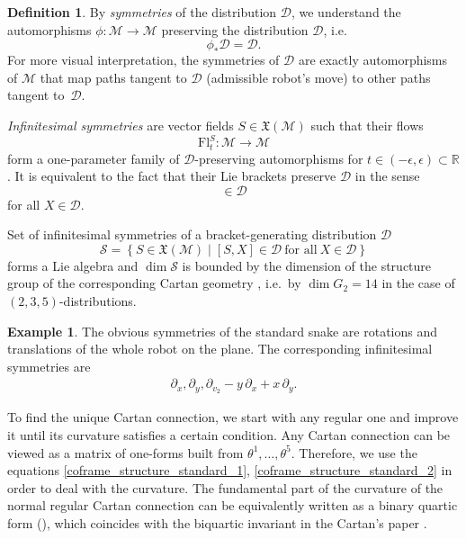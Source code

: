\documentclass{amsart}
\theoremstyle{plain}
\theoremstyle{definition}
\newtheorem*{definition}{Definition}
\newtheorem*{example}{Example}
\theoremstyle{remark}
\newcommand{\R}{\mathbb{R}}
\newcommand{\mc}[1]{\mathcal{#1}}
\newcommand{\mfk}[1]{\mathfrak{#1}}
\begin{document}
\begin{definition}
    By \emph{symmetries} of the distribution $\mc{D}$, we understand the automorphisms $\phi\colon \mc{M} \to \mc{M}$ preserving the distribution $\mc{D}$, i.e.
\begin{equation*}
    \phi_* \mc{D} = \mc{D}.
\end{equation*}
For more visual interpretation, the symmetries of $\mc{D}$ are exactly automorphisms of $\mc{M}$ that map paths tangent to $\mc{D}$ (admissible robot's move) to other paths tangent to~$\mc{D}$.

\emph{Infinitesimal symmetries} are vector fields $S \in \mfk{X}(\mc{M})$ such that their flows
\begin{equation*}
    \mathrm{Fl}^S_t\colon \mc{M} \to \mc{M}
\end{equation*}
form a one-parameter family of $\mc{D}$-preserving automorphisms for $t\in (-\epsilon, \epsilon) \subset \R$. It is equivalent to the fact that their Lie brackets preserve $\mc{D}$ in the sense
\begin{equation}
    [S, X] \in \mc{D}
\end{equation}
for all $X \in \mc{D}$.
\end{definition}

Set of infinitesimal symmetries of a bracket-generating distribution $\mc{D}$
\begin{equation}
    \mc{S} = \left\{ S \in \mfk{X}(\mc{M}) \mid [S,X]\in \mc{D}\ \text{for all}\ X\in\mc{D} \right\}
\end{equation}
forms a Lie algebra and $\dim \mc{S}$ is bounded by the dimension of the structure group of the corresponding Cartan geometry \cite[Theorem 1.5.11]{parabook}, i.e.~by $\dim G_2 = 14$ in the case of $(2,3,5)$-distributions.

\begin{example}
    The obvious symmetries of the standard snake are rotations and translations of the whole robot on the plane. The corresponding infinitesimal symmetries are
    \begin{align*}
        \partial_x, \partial_y, \partial_{v_2} - y\, \partial_{x} + x\, \partial_y.
    \end{align*}
\end{example}

To find the unique Cartan connection, we start with any regular one and improve it until its curvature satisfies a certain condition. Any Cartan connection can be viewed as a matrix of one-forms built from $\theta^1, \dots, \theta^5$. Therefore, we use the equations \eqref{coframe_structure_standard_1}, \eqref{coframe_structure_standard_2}
in order to deal with the curvature. The fundamental part of the curvature of the normal regular Cartan connection can be equivalently written as a binary quartic form (\cite[p.~26]{dt2022}), which coincides with the biquartic invariant in the Cartan's paper \cite[p.~152]{ec1910}.
\end{document}
